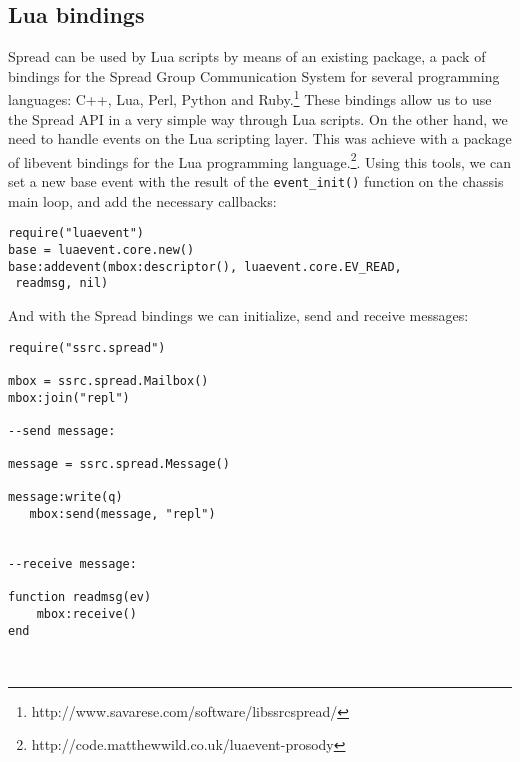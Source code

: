 \subsection{Lua bindings}

Spread can be used by Lua scripts by means of an existing package, a pack of bindings for the Spread Group Communication System for several programming languages: C++, Lua, Perl, Python and Ruby.\footnote{http://www.savarese.com/software/libssrcspread/} These bindings allow us to use the Spread API in a very simple way through Lua scripts. 
On the other hand, we need to handle events on the Lua scripting layer. This was achieve with a package of libevent bindings for the Lua programming language.\footnote{http://code.matthewwild.co.uk/luaevent-prosody}.
Using this tools, we can set a new base event with the result of the \texttt{event\_init()} function on the chassis main loop, and add the necessary callbacks:\\

\begin{lstlisting}
require("luaevent")
base = luaevent.core.new()
base:addevent(mbox:descriptor(), luaevent.core.EV_READ,
 readmsg, nil)

\end{lstlisting}

\vspace{5mm}

And with the Spread bindings we can initialize, send and receive messages:\\

\begin{lstlisting}
require("ssrc.spread")

mbox = ssrc.spread.Mailbox()
mbox:join("repl")

--send message:

message = ssrc.spread.Message()

message:write(q)
   mbox:send(message, "repl")


--receive message:

function readmsg(ev)
	mbox:receive()
end



\end{lstlisting}

